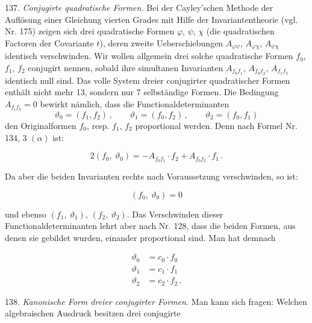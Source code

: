 137. \textit{Conjugirte quadratische Formen.} Bei der Cayley'schen Methode der Aufl\"osung einer Gleichung vierten Grades mit Hilfe der Invariantentheorie (vgl. Nr. 175) zeigen sich drei quadratische Formen $\varphi$, $\psi$, $\chi$ (die quadratischen Factoren der Covariante $t$), deren zweite Ueberschiebungen $A_{\varphi\psi}$, $A_{\varphi\chi}$, $A_{\psi\chi}$ identisch verschwinden. Wir wollen allgemein drei solche quadratische Formen $f_0$, $f_1$, $f_2$ conjugirt nennen, sobald ihre simultanen Invarianten $A_{f_0f_1}$, $A_{f_0f_2}$, $A_{f_1f_2}$ identisch null sind. Das volle System dreier conjugirter quadratischer Formen enth\"alt nicht mehr 13, sondern nur 7 selbst\"andige Formen. Die Bedingung $A_{f_if_k} = 0$ bewirkt n\"amlich, dass die Functionaldeterminanten
\[
\vartheta_0 = (f_1, f_2)\,,\qquad \vartheta_1 = (f_0, f_2)\,,\qquad \vartheta_2 = (f_0, f_1)
\]
den Originalformen $f_0$, resp. $f_1$, $f_2$ proportional werden. Denn nach Formel Nr. 134, 3 $(\alpha)$ ist:

\[
2(f_0,\ \vartheta_0) = -A_{f_0f_1}\cdot f_2 + A_{f_0f_2}\cdot f_1\,.
\]

Da aber die beiden Invarianten rechts nach Voraussetzung verschwinden, so ist:

\[
(f_0,\ \vartheta_0) = 0
\]

und ebenso $(f_1,\ \vartheta_1)$, $(f_2,\ \vartheta_2)$. Das Verschwinden dieser Functionaldeterminanten lehrt aber nach Nr. 128, dass die beiden Formen, aus denen sie gebildet wurden, einander proportional sind. Man hat demnach

\[
\begin{aligned}
\vartheta_0 &= c_0 \cdot f_0 \\
\vartheta_1 &= c_1 \cdot f_1 \\
\vartheta_2 &= c_2 \cdot f_2\,.
\end{aligned}
\]

138. \textit{Kanonische Form dreier conjugirter Formen.} Man kann sich fragen: Welchen algebraischen Ausdruck besitzen drei conjugirte


